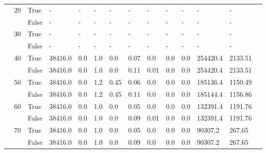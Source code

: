 \begin{landscape}
\begin{small}
\begin{longtable}[c]{@{}lll|ll|ll|ll|ll|lll@{}}
   & 20 & True  & -               & -              & -             & -             & -             & -             & -             & -             & -             & -           &  \\
   &    & False & -               & -              & -             & -             & -             & -             & -             & -             & -             & -           &  \\
   & 30 & True  & -               & -              & -             & -             & -             & -             & -             & -             & -             & -           &  \\
   &    & False & -               & -              & -             & -             & -             & -             & -             & -             & -             & -           &  \\
   & 40 & True  & 38416.0         & 0.0            & 1.0           & 0.0           & 0.07          & 0.0           & 0.0           & 0.0           & 254420.4      & 2133.51     &  \\
   &    & False & 38416.0         & 0.0            & 1.0           & 0.0           & 0.11          & 0.01          & 0.0           & 0.0           & 254420.4      & 2133.51     &  \\
   & 50 & True  & 38416.0         & 0.0            & 1.2           & 0.45          & 0.06          & 0.0           & 0.0           & 0.0           & 185136.4      & 1150.49     &  \\
   &    & False & 38416.0         & 0.0            & 1.2           & 0.45          & 0.11          & 0.0           & 0.0           & 0.0           & 185144.4      & 1156.86     &  \\
   & 60 & True  & 38416.0         & 0.0            & 1.0           & 0.0           & 0.05          & 0.0           & 0.0           & 0.0           & 132391.4      & 1191.76     &  \\
   &    & False & 38416.0         & 0.0            & 1.0           & 0.0           & 0.09          & 0.01          & 0.0           & 0.0           & 132391.4      & 1191.76     &  \\
   & 70 & True  & 38416.0         & 0.0            & 1.0           & 0.0           & 0.05          & 0.0           & 0.0           & 0.0           & 90307.2       & 267.65      &  \\
   &    & False & 38416.0         & 0.0            & 1.0           & 0.0           & 0.09          & 0.0           & 0.0           & 0.0           & 90307.2       & 267.65      &  \\

\end{longtable}
\end{small}
\end{landscape}
